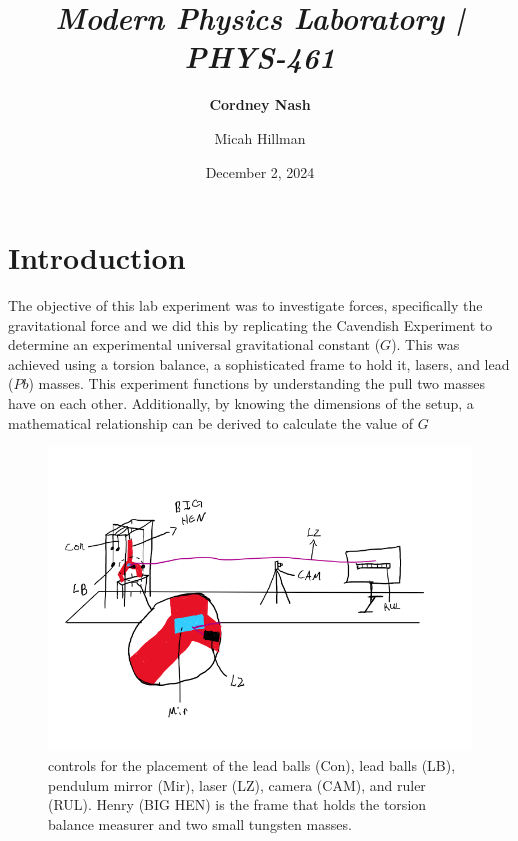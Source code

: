 \documentclass[a4paper,12pt,english]{all-in-one} %
\title{{\large\textit{Modern Physics Laboratory | PHYS-461}}\\[0.5cm]{\Huge\color{gray}\textsc{\@docsubtitle}}}
\author{\textbf{Cordney Nash}  \and Micah Hillman  }
\date{December 2, 2024}
\begin{document}
\begin{titlepage}
\maketitle\vfill
\end{titlepage}
\newpage 


\section*{Introduction}
{
The objective of this lab experiment was to investigate forces, specifically the gravitational force and we did this by replicating the Cavendish Experiment to determine an experimental universal gravitational constant ($G$). This was achieved using a torsion balance, a sophisticated frame to hold it, lasers, and lead ($Pb$) masses. This experiment functions by understanding the pull two masses have on each other. Additionally, by knowing the dimensions of the setup, a mathematical relationship can be derived to calculate the value of $G$
}

\begin{figure}[tbh]
    \centering
    \includegraphics[width=0.8\linewidth]{7-cavendish/overleaf/droc/images/cavendish_schem.PNG}
    \caption{ \scriptsize{ controls for the placement of the lead balls (Con), lead balls (LB), pendulum mirror (Mir), laser (LZ), camera (CAM), and ruler (RUL). Henry (BIG HEN) is the frame that holds the torsion balance measurer and two small tungsten masses.
    }}
    \label{fig:compton-diagram}
\end{figure}

\end{document}

